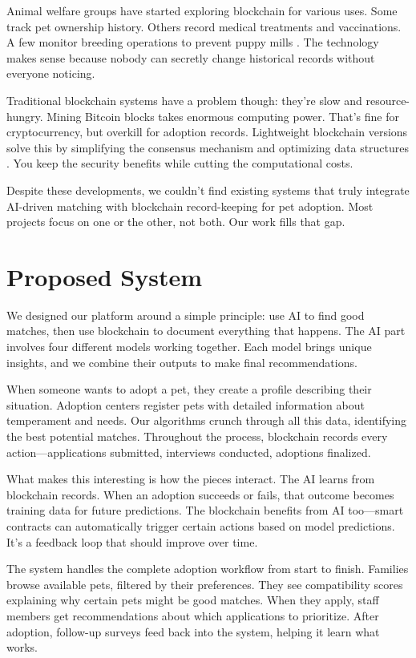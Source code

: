 \documentclass[conference]{IEEEtran}
\begin{document}
Animal welfare groups have started exploring blockchain for various uses. Some track pet ownership history. Others record medical treatments and vaccinations. A few monitor breeding operations to prevent puppy mills \cite{animalblock2024}. The technology makes sense because nobody can secretly change historical records without everyone noticing.

Traditional blockchain systems have a problem though: they're slow and resource-hungry. Mining Bitcoin blocks takes enormous computing power. That's fine for cryptocurrency, but overkill for adoption records. Lightweight blockchain versions solve this by simplifying the consensus mechanism and optimizing data structures \cite{lightweight2023}. You keep the security benefits while cutting the computational costs.

Despite these developments, we couldn't find existing systems that truly integrate AI-driven matching with blockchain record-keeping for pet adoption. Most projects focus on one or the other, not both. Our work fills that gap.

\section{Proposed System}

We designed our platform around a simple principle: use AI to find good matches, then use blockchain to document everything that happens. The AI part involves four different models working together. Each model brings unique insights, and we combine their outputs to make final recommendations.

When someone wants to adopt a pet, they create a profile describing their situation. Adoption centers register pets with detailed information about temperament and needs. Our algorithms crunch through all this data, identifying the best potential matches. Throughout the process, blockchain records every action—applications submitted, interviews conducted, adoptions finalized.

What makes this interesting is how the pieces interact. The AI learns from blockchain records. When an adoption succeeds or fails, that outcome becomes training data for future predictions. The blockchain benefits from AI too—smart contracts can automatically trigger certain actions based on model predictions. It's a feedback loop that should improve over time.

The system handles the complete adoption workflow from start to finish. Families browse available pets, filtered by their preferences. They see compatibility scores explaining why certain pets might be good matches. When they apply, staff members get recommendations about which applications to prioritize. After adoption, follow-up surveys feed back into the system, helping it learn what works.
\end{document}
